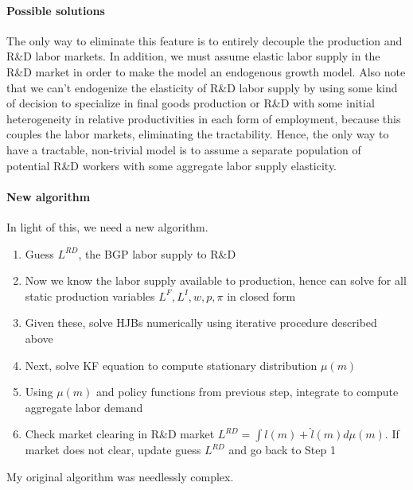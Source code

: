 \documentclass[12pt,english]{article}
\theoremstyle{remark}
\begin{document}
\paragraph{Possible solutions} The only way to eliminate this feature is to entirely decouple the production and R\&D labor markets. In addition, we must assume elastic labor supply in the R\&D market in order to make the model an endogenous growth model. Also note that we can't endogenize the elasticity of R\&D labor supply by using some kind of decision to specialize in final goods production or R\&D with some initial heterogeneity in relative productivities in each form of employment, because this couples the labor markets, eliminating the tractability. Hence, the only way to have a tractable, non-trivial model is to assume a separate population of potential R\&D workers with some aggregate labor supply elasticity.

\paragraph{New algorithm}
In light of this, we need a new algorithm.
\begin{enumerate}
	\item Guess $L^{RD}$, the BGP labor supply to R\&D
	\item Now we know the labor supply available to production, hence can solve for all static production variables $L^F,L^I,w,p,\pi$ in closed form
	\item Given these, solve HJBs numerically using iterative procedure described above
	\item Next, solve KF equation to compute stationary distribution $\mu(m)$
	\item Using $\mu(m)$ and policy functions from previous step, integrate to compute aggregate labor demand 
	\item Check market clearing in R\&D market $L^{RD} = \int l(m) + \hat{l}(m) d\mu(m)$. If market does not clear, update guess $L^{RD}$ and go back to Step 1 
\end{enumerate}

My original algorithm was needlessly complex. 
\end{document}
